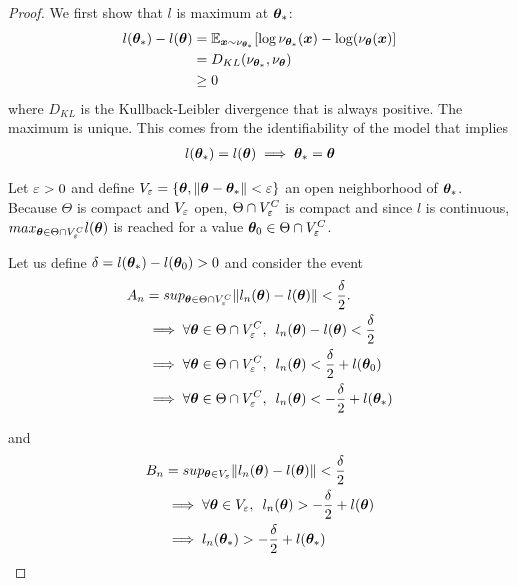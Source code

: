 \begin{proof}
  We first show that $l$ is maximum at $\boldsymbol{\theta}_*$:
  \begin{align}
    l(\boldsymbol{\theta}_*) - l(\boldsymbol{\theta}) &= \mathbb{E}_{\boldsymbol{x} \sim \nu_{\boldsymbol{\theta}_*}}[\log \nu_{\boldsymbol{\theta}_*}(\boldsymbol{x}) - \log(\nu_{\boldsymbol{\theta}}(\boldsymbol{x})] \\
                            &= D_{KL}(\nu_{\boldsymbol{\theta}_*}, \nu_{\boldsymbol{\theta}}) \\ \label{kl-likelihood}
                            &\geq 0
  \end{align}
  where $D_{KL}$ is the Kullback-Leibler divergence that is always positive.
  The maximum is unique. This comes from the identifiability of the model that
  implies
  \begin{align}
    l(\boldsymbol{\theta}_*) = l(\boldsymbol{\theta}) \implies \boldsymbol{\theta}_* = \boldsymbol{\theta}
  \end{align}

  Let $\varepsilon > 0$ and define $V_{\varepsilon} = \{\boldsymbol{\theta}, \|\boldsymbol{\theta} - \boldsymbol{\theta}_*\| <
  \varepsilon\}$ an open neighborhood of $\boldsymbol{\theta}_*$.
  Because $\Theta$ is compact and $V_{\varepsilon}$ open, $\Theta \cap
  V_{\varepsilon}^C$ is compact and since $l$ is continuous, $max_{\boldsymbol{\theta} \in \Theta
    \cap V_{\varepsilon}^C} l(\boldsymbol{\theta})$ is reached for a value $\boldsymbol{\theta}_0 \in \Theta \cap V_{\varepsilon}^C$.
  
  Let us define $\delta = l(\boldsymbol{\theta}_*) - l(\boldsymbol{\theta}_0) > 0$ and consider the event
  \begin{align}
    A_n &= sup_{\boldsymbol{\theta} \in \Theta \cap V_{\varepsilon}^C} \|l_n(\boldsymbol{\theta}) - l(\boldsymbol{\theta})\| < \frac{\delta}{2}. \\
        &\implies \forall \boldsymbol{\theta} \in \Theta \cap V_{\varepsilon}^C,  \enspace l_n(\boldsymbol{\theta}) - l(\boldsymbol{\theta}) < \frac{\delta}{2} \\
        &\implies \forall \boldsymbol{\theta} \in \Theta \cap V_{\varepsilon}^C,  \enspace l_n(\boldsymbol{\theta}) < \frac{\delta}{2} + l(\boldsymbol{\theta}_0) \\
        &\implies \forall \boldsymbol{\theta} \in \Theta \cap V_{\varepsilon}^C,  \enspace l_n(\boldsymbol{\theta}) < -\frac{\delta}{2} + l(\boldsymbol{\theta}_*)
  \end{align}

  and 
  \begin{align}
    B_n &= sup_{\boldsymbol{\theta} \in V_{\varepsilon}} \|l_n(\boldsymbol{\theta}) - l(\boldsymbol{\theta})\| < \frac{\delta}{2} \\
        &\implies \forall \boldsymbol{\theta} \in V_{\varepsilon}, \enspace l_n(\boldsymbol{\theta}) > -\frac{\delta}{2} + l(\boldsymbol{\theta}) \\
        &\implies l_n(\boldsymbol{\theta}_*) > -\frac{\delta}{2} + l(\boldsymbol{\theta}_*) \\
  \end{align}


\end{proof}
